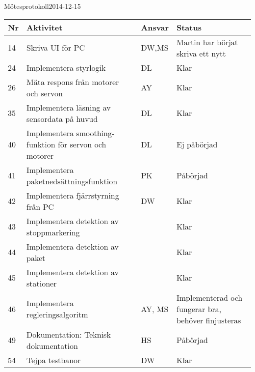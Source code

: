 \documentclass[titlepage, a4paper]{article}
\begin{document}
	\begin{projektmote}{Mötesprotokoll}{2014-12-15}
	\end{projektmote}

	\newpage
	\begin{center}
		\begin{tabularx}{\textwidth}{| p{4mm} | X | p{13.5mm} | X |}
			\hline
			\textbf{Nr} & \textbf{Aktivitet} & \textbf{Ansvar} & \textbf{Status} \\\hline
			{14} & {Skriva UI för PC} & {DW,MS} & {Martin har börjat skriva ett nytt} \\\hline
			{24} & {Implementera styrlogik} & {DL} & {Klar} \\\hline
			{26} & {Mäta respons från motorer och servon} & {AY} & {Klar} \\\hline
			{35} & {Implementera läsning av sensordata på huvud} & {DL} & {Klar} \\\hline
			{40} & {Implementera smoothing-funktion för servon och motorer} & {DL} & {Ej påbörjad} \\\hline
			{41} & {Implementera paketnedsättningsfunktion} & {PK} & {Påbörjad} \\\hline
			{42} & {Implementera fjärrstyrning från PC} & {DW} & {Klar} \\\hline
			{43} & {Implementera detektion av stoppmarkering} & {} & {Klar} \\\hline
			{44} & {Implementera detektion av paket} & {} & {Klar} \\\hline
			{45} & {Implementera detektion av stationer} & {} & {Klar} \\\hline
			{46} & {Implementera regleringsalgoritm} & {AY, MS} & {Implementerad och fungerar bra, behöver finjusteras} \\\hline
			{49} & {Dokumentation: Teknisk dokumentation} & {HS} & {Påbörjad} \\\hline
			{54} & {Tejpa testbanor} & {DW} & {Klar} \\\hline
		\end{tabularx}
	\end{center}
\end{document}
